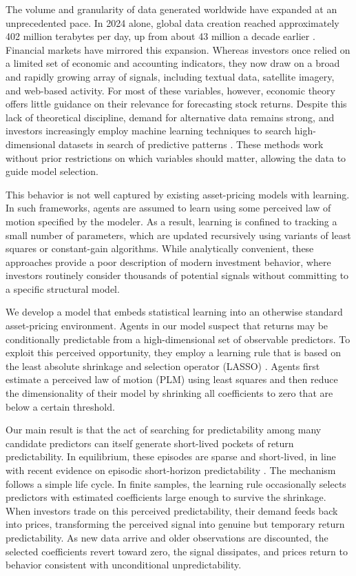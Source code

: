 \documentclass[11pt]{article}
\begin{document}
The volume and granularity of data generated worldwide have expanded at an unprecedented pace. 
In 2024 alone, global data creation reached approximately 402 million terabytes per day, up from about 43 million a decade earlier \citep{DataSphere2025}. 
Financial markets have mirrored this expansion. Whereas investors once relied on a limited set of economic and accounting indicators, they now draw on a broad and rapidly growing array of signals, including textual data, satellite imagery, and web-based activity. 
For most of these variables, however, economic theory offers little guidance on their relevance for forecasting stock returns. 
Despite this lack of theoretical discipline, demand for alternative data remains strong, and investors increasingly employ machine learning techniques to search high-dimensional datasets in search of predictive patterns \citep{Invesco2024IGSIS}. 
These methods work without prior restrictions on which variables should matter, allowing the data to guide model selection.

This behavior is not well captured by existing asset-pricing models with learning. 
In such frameworks, agents are assumed to learn using some perceived law of motion specified by the modeler.
As a result, learning is confined to tracking a small number of parameters, which are updated recursively using variants of least squares or constant-gain algorithms. 
While analytically convenient, these approaches provide a poor description of modern investment behavior, where investors routinely consider thousands of potential signals without committing to a specific structural model.

We develop a model that embeds statistical learning into an otherwise standard asset-pricing environment. 
Agents in our model suspect that returns may be conditionally predictable from a high-dimensional set of observable predictors. 
To exploit this perceived opportunity, they employ a learning rule that is based on the least absolute shrinkage and selection operator (LASSO) \citep{Tibshirani1996}.
Agents first estimate a perceived law of motion (PLM) using least squares and then reduce the dimensionality of their model by shrinking all coefficients to zero that are below a certain threshold.

Our main result is that the act of searching for predictability among many candidate predictors can itself generate short-lived pockets of return predictability. 
In equilibrium, these episodes are sparse and short-lived, in line with recent evidence on episodic short-horizon predictability \citep{Chinco2019, Farmer2023}. 
The mechanism follows a simple life cycle. 
In finite samples, the learning rule occasionally selects predictors with estimated coefficients large enough to survive the shrinkage.
When investors trade on this perceived predictability, their demand feeds back into prices, transforming the perceived signal into genuine but temporary return predictability. 
As new data arrive and older observations are discounted, the selected coefficients revert toward zero, the signal dissipates, and prices return to behavior consistent with unconditional unpredictability.
\end{document}
